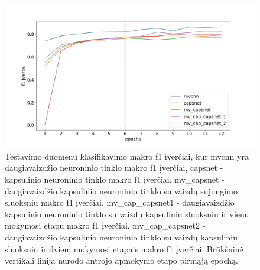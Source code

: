 \begin{figure}[H]
	\centering
	\includegraphics[scale=0.4]{img/macro.png}
	\caption{
		Testavimo duomenų klasifikavimo makro f1 įverčiai, kur mvcnn yra daugiavaizdžio neuroninio tinklo makro f1 įverčiai, capsnet - kapsulinio neuroninio tinklo makro f1 įverčiai, mv\_capsnet - daugiavaizdžio kapsulinio neuroninio tinklo su vaizdų sujungimo sluoksniu makro f1 įverčiai, mv\_cap\_capsnet1 - daugiavaizdžio kapsulinio neuroninio tinklo su vaizdų kapsuliniu sluoksniu ir vienu mokymosi etapu makro f1 įverčiai, mv\_cap\_capsnet2 - daugiavaizdžio kapsulinio neuroninio tinklo su vaizdų kapsuliniu sluoksniu ir dviem mokymosi etapais makro f1 įverčiai. Brūkšninė vertikali linija nurodo antrojo apmokymo etapo pirmąją epochą.
	}
	\label{img:macro_f1}
\end{figure}

